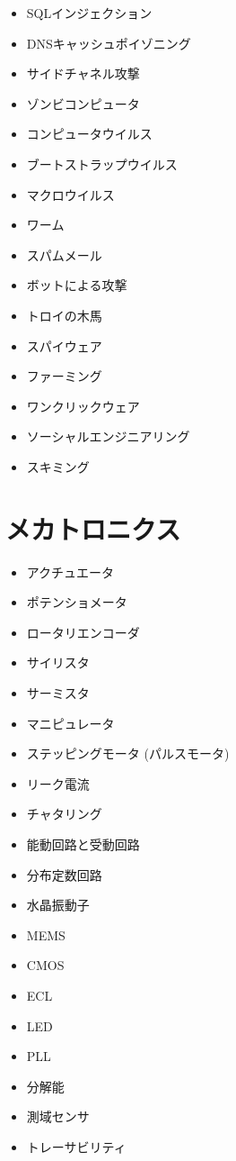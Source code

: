 \documentclass[a4j, titlepage, 11pt]{jsarticle}
\begin{document}
\begin{multicols}{2}
\begin{itemize}
	\item SQLインジェクション
	\item DNSキャッシュポイゾニング
	\item サイドチャネル攻撃
	\item ゾンビコンピュータ
	\item コンピュータウイルス
	\item ブートストラップウイルス
	\item マクロウイルス
	\item ワーム
	\item スパムメール
	\item ボットによる攻撃
	\item トロイの木馬
	\item スパイウェア
	\item ファーミング
	\item ワンクリックウェア
	\item ソーシャルエンジニアリング
	\item スキミング
\end{itemize}
\end{multicols}

\section{メカトロニクス}
\begin{multicols}{2}
\begin{itemize}
	\item アクチュエータ
	\item ポテンショメータ
	\item ロータリエンコーダ
	\item サイリスタ
	\item サーミスタ
	\item マニピュレータ
	\item ステッピングモータ (パルスモータ)
	\item リーク電流
	\item チャタリング
	\item 能動回路と受動回路
	\item 分布定数回路
	\item 水晶振動子
	\item MEMS
	\item CMOS
	\item ECL
	\item LED
	\item PLL
	\item 分解能
	\item 測域センサ
	\item トレーサビリティ
\end{itemize}
\end{multicols}
\end{document}
